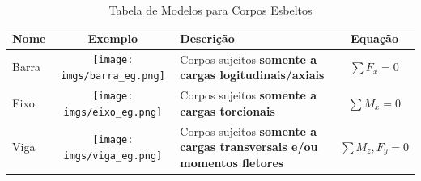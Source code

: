 \documentclass{article}
\begin{document}
\begin{table}[h]
    \centering
    \begin{tabular}{|l|c|l|c|}\hline
        \textbf{Nome} & \textbf{Exemplo} & \textbf{Descrição} & \textbf{Equação} \\ \hline
        Barra
                      &
        \begin{minipage}{.4\textwidth}
            \texttt{[image: imgs/barra\_eg.png]}
        \end{minipage}
                      &
        \begin{minipage}{.3\textwidth}
            Corpos sujeitos \textbf{somente a cargas logitudinais/axiais}
        \end{minipage}
                      &
        $\sum F_x = 0$                                                           \\ \hline

        Eixo
                      &
        \begin{minipage}{.4\textwidth}
            \vspace{10px}
            \texttt{[image: imgs/eixo\_eg.png]}
        \end{minipage}
                      &
        \begin{minipage}{.3\textwidth}
            Corpos sujeitos \textbf{somente a cargas torcionais}
        \end{minipage}
                      &
        $\sum M_x = 0$                                                           \\ \hline
        Viga
                      &
        \begin{minipage}{.4\textwidth}
            \vspace{10px}
            \texttt{[image: imgs/viga\_eg.png]}
        \end{minipage}
                      &
        \begin{minipage}{.3\textwidth}
            Corpos sujeitos \textbf{somente a cargas transversais e/ou momentos fletores}
        \end{minipage}
                      &
        $\sum M_z,F_y = 0$                                                       \\ \hline
    \end{tabular}
    \caption{Tabela de Modelos para Corpos Esbeltos}
\end{table}

\newpage
\end{document}

